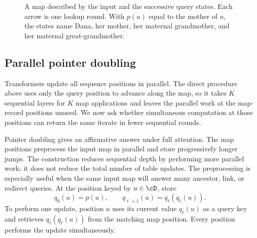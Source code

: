 \documentclass[11pt,twoside]{article}
\theoremstyle{definition}
\theoremstyle{remark}
\begin{document}
\begin{figure}[ht]
\centering
{}
\caption{A map described by the input and the successive query states. Each
arrow is one lookup round. With $p(u)$ equal to the mother of $u$, the states
name Dana, her mother, her maternal grandmother, and her maternal
great-grandmother.}
\label{fig:sequential-lookup}
\end{figure}

\subsection{Parallel pointer doubling}
\label{sec:pointer}

Transformers update all sequence positions in parallel. The direct procedure
above uses only the query position to advance along the map, so it takes $K$
sequential layers for $K$ map applications and leaves the parallel work at the
map-record positions unused. We now ask whether simultaneous computation at
those positions can return the same iterate in fewer sequential rounds.

Pointer doubling gives an affirmative answer under full attention. The map
positions preprocess the input map in parallel and store progressively longer
jumps. The construction reduces sequential depth by performing more parallel
work; it does not reduce the total number of table updates. The preprocessing
is especially useful when the same input map will answer many ancestor, link,
or redirect queries.
At the position keyed by $u\in\cD$, store
\begin{equation}
 q_0(u)=p(u),
 \qquad q_{\ell+1}(u)=q_\ell(q_\ell(u)).
 \label{eq:pointer-doubling}
\end{equation}
To perform one update, position $u$ uses its current value $q_\ell(u)$ as a
query key and retrieves $q_\ell(q_\ell(u))$ from the matching map position.
Every position performs the update simultaneously.
\end{document}
